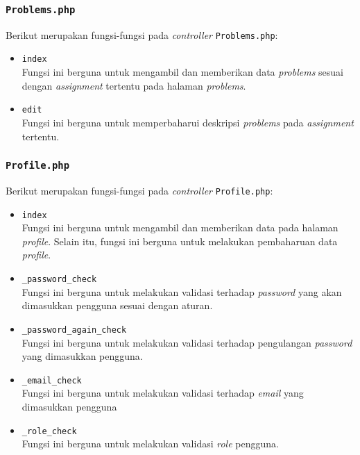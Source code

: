 \subsubsection{\texttt{Problems.php}}
Berikut merupakan fungsi-fungsi pada \textit{controller} \texttt{Problems.php}:
\begin{itemize}
	\item \texttt{index}\\
	Fungsi ini berguna untuk mengambil dan memberikan data \textit{problems} sesuai dengan \textit{assignment} tertentu pada halaman \textit{problems}.
	\item \texttt{edit}\\
	Fungsi ini berguna untuk memperbaharui deskripsi \textit{problems} pada \textit{assignment} tertentu.
\end{itemize}
\subsubsection{\texttt{Profile.php}}
Berikut merupakan fungsi-fungsi pada \textit{controller} \texttt{Profile.php}:
\begin{itemize}
	\item \texttt{index}\\
	Fungsi ini berguna untuk mengambil dan memberikan data pada halaman \textit{profile}. Selain itu, fungsi ini berguna untuk melakukan pembaharuan data \textit{profile}.
	\item \texttt{\_password\_check}\\
	Fungsi ini berguna untuk melakukan validasi terhadap \textit{password} yang akan dimasukkan pengguna sesuai dengan aturan.
	\item \texttt{\_password\_again\_check}\\
	Fungsi ini berguna untuk melakukan validasi terhadap pengulangan \textit{password} yang dimasukkan pengguna.
	\item \texttt{\_email\_check}\\
	Fungsi ini berguna untuk melakukan validasi terhadap \textit{email} yang dimasukkan pengguna
	\item \texttt{\_role\_check}\\
	 Fungsi ini berguna untuk melakukan validasi \textit{role} pengguna.
\end{itemize}
